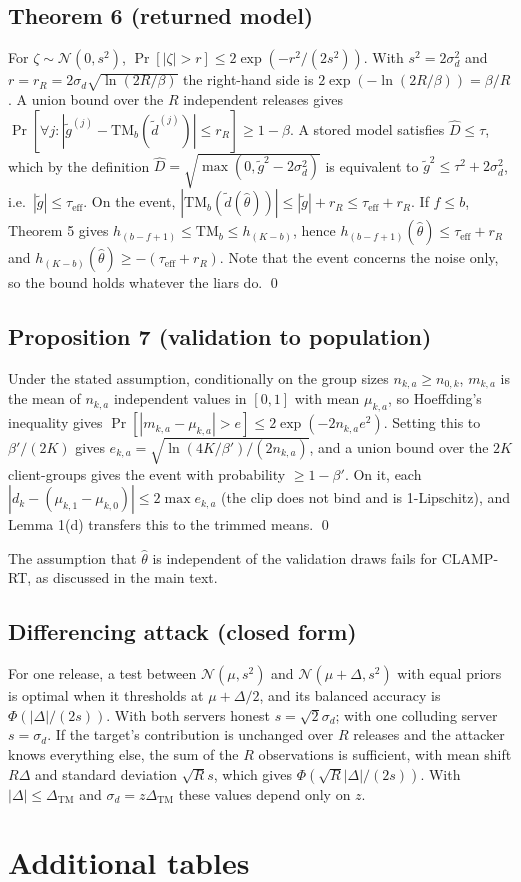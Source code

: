 \documentclass[11pt]{article}
\theoremstyle{plain}
\theoremstyle{definition}
\newcommand{\Dhat}{\widehat{D}}
\newcommand{\TM}{\mathrm{TM}_b}
\newcommand{\DTM}{\Delta_{\mathrm{TM}}}
\newcommand{\gt}{\tilde g}
\newcommand{\rt}{CLAMP-RT}
\begin{document}
\subsection*{Theorem 6 (returned model)}
For $\zeta\sim\mathcal{N}(0,s^2)$, $\Pr[|\zeta|>r]\le2\exp(-r^2/(2s^2))$. With $s^2=2\sigma_d^2$ and $r=r_R=2\sigma_d\sqrt{\ln(2R/\beta)}$ the right-hand side is $2\exp(-\ln(2R/\beta))=\beta/R$. A union bound over the $R$ independent releases gives $\Pr[\forall j:|\gt^{(j)}-\TM(\tilde d^{(j)})|\le r_R]\ge1-\beta$. A stored model satisfies $\Dhat\le\tau$, which by the definition $\Dhat=\sqrt{\max(0,\gt^2-2\sigma_d^2)}$ is equivalent to $\gt^2\le\tau^2+2\sigma_d^2$, i.e.\ $|\gt|\le\tau_{\mathrm{eff}}$. On the event, $|\TM(\tilde d(\hat\theta))|\le|\gt|+r_R\le\tau_{\mathrm{eff}}+r_R$. If $f\le b$, Theorem 5 gives $h_{(b-f+1)}\le\TM\le h_{(K-b)}$, hence $h_{(b-f+1)}(\hat\theta)\le\tau_{\mathrm{eff}}+r_R$ and $h_{(K-b)}(\hat\theta)\ge-(\tau_{\mathrm{eff}}+r_R)$. Note that the event concerns the noise only, so the bound holds whatever the liars do. \qed

\subsection*{Proposition 7 (validation to population)}
Under the stated assumption, conditionally on the group sizes $n_{k,a}\ge n_{0,k}$, $m_{k,a}$ is the mean of $n_{k,a}$ independent values in $[0,1]$ with mean $\mu_{k,a}$, so Hoeffding's inequality gives $\Pr[|m_{k,a}-\mu_{k,a}|>e]\le2\exp(-2n_{k,a}e^2)$. Setting this to $\beta'/(2K)$ gives $e_{k,a}=\sqrt{\ln(4K/\beta')/(2n_{k,a})}$, and a union bound over the $2K$ client-groups gives the event with probability $\ge1-\beta'$. On it, each $|d_k-(\mu_{k,1}-\mu_{k,0})|\le2\max e_{k,a}$ (the clip does not bind and is 1-Lipschitz), and Lemma 1(d) transfers this to the trimmed means. \qed

The assumption that $\hat\theta$ is independent of the validation draws fails for \rt{}, as discussed in the main text.

\subsection*{Differencing attack (closed form)}
For one release, a test between $\mathcal{N}(\mu,s^2)$ and $\mathcal{N}(\mu+\Delta,s^2)$ with equal priors is optimal when it thresholds at $\mu+\Delta/2$, and its balanced accuracy is $\Phi(|\Delta|/(2s))$. With both servers honest $s=\sqrt2\sigma_d$; with one colluding server $s=\sigma_d$. If the target's contribution is unchanged over $R$ releases and the attacker knows everything else, the sum of the $R$ observations is sufficient, with mean shift $R\Delta$ and standard deviation $\sqrt R s$, which gives $\Phi(\sqrt R|\Delta|/(2s))$. With $|\Delta|\le\DTM$ and $\sigma_d=z\DTM$ these values depend only on $z$.

\clearpage
\section{Additional tables}








\end{document}
